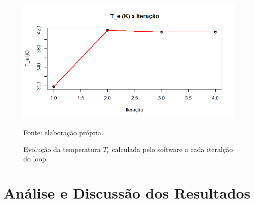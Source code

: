 \documentclass[12pt]{scrartcl}
\begin{document}
\begin{figure}[h!]
    \caption{Evolução da temperatura $T_e$ calculada pelo software a cada iteralção do loop.}
    \label{fig:solucaoTe298}
    \centering
    \includegraphics[scale=0.75]{Te_x_Iteracao_298K.png}
    \par{Fonte: elaboração própria.}
\end{figure}

\section{Análise e Discussão dos Resultados} \label{discussion}
\end{document}
